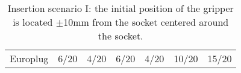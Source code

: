 \begin{table}[]
\begin{tabular}{l|r|r|r|r|r|r}
Europlug  & 6/20                         & 4/20                                                                        & 6/20                                                                        & 4/20                                                                        & 10/20                                                                        & 15/20                                                                
\end{tabular}
\caption{Insertion scenario I: the initial position of the gripper is located $\pm$10mm from the socket centered around the socket.}
\label{table:easy}
\end{table}
